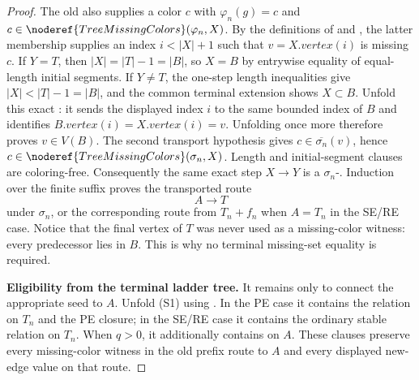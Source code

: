 \begin{proof}
The old  also supplies a color \(c\) with
\(\varphi_n(g)=c\) and
\(c\in\noderef{TreeMissingColors}(\varphi_n,X)\).  By the definitions of
 and , the latter
membership supplies an index \(i<|X|+1\) such that
\(v=X.\mathit{vertex}(i)\) is missing \(c\).  If \(Y=T\),
then \(|X|=|T|-1=|B|\), so \(X=B\) by entrywise equality of equal-length
initial segments.  If \(Y\ne T\), the one-step length inequalities give
\(|X|<|T|-1=|B|\), and the common terminal extension shows
\(X\subset B\).  Unfold this exact
: it sends the displayed index \(i\)
to the same bounded index of \(B\) and identifies
\(B.\mathit{vertex}(i)=X.\mathit{vertex}(i)=v\).  Unfolding
 once more therefore proves
\(v\in V(B)\).  The second transport hypothesis gives
\(c\in\overline{\sigma_n}(v)\), hence
\(c\in\noderef{TreeMissingColors}(\sigma_n,X)\).  Length and
initial-segment clauses are coloring-free.  Consequently the same exact
step \(X\to Y\) is a
\(\sigma_n\)-.  Induction over the finite
suffix proves the transported route
\[
                       A\longrightarrow T                     \tag{6}
\]
under \(\sigma_n\), or the corresponding route from \(T_n+f_n\) when
\(A=T_n\) in the SE/RE case.  Notice that the final vertex of \(T\) was
never used as a missing-color witness: every predecessor lies in \(B\).
This is why no terminal missing-set equality is required.

\textbf{Eligibility from the terminal ladder tree.}
It remains only to connect the appropriate seed to \(A\).  Unfold (S1)
using .  In the PE case it contains the
 relation on \(T_n\) and the PE closure;
in the SE/RE case it contains the ordinary stable relation on \(T_n\).
When \(q>0\), it additionally contains
 on \(A\).  These clauses preserve every
missing-color witness in the old prefix route to \(A\) and every displayed
new-edge value on that route.


\end{proof}

